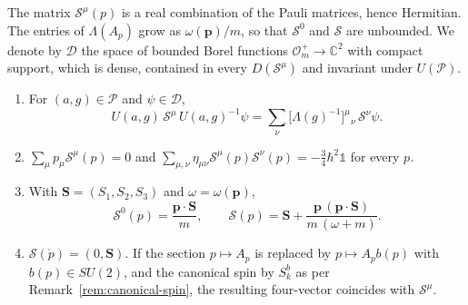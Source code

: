 \begin{remark}\label{rem:spin-four-vector-domain}
	The matrix $\mathcal{S}^\mu(p)$ is a real combination of the Pauli matrices, hence Hermitian. The entries of $\Lambda(A_p)$ grow as $\omega(\mathbf{p})/m$, so that $\mathcal{S}^0$ and $\boldsymbol{\mathcal{S}}$ are unbounded. We denote by $\mathcal{D}$ the space of bounded Borel functions $\mathcal{O}_m^+\to\mathbb{C}^2$ with compact support, which is dense, contained in every $D(\mathcal{S}^\mu)$ and invariant under $U(\mathcal{P})$.
\end{remark}

\begin{proposition}\label{prop:spin-four-vector}
	\begin{enumerate}
		\item For $(a,g)\in\mathcal{P}$ and $\psi\in\mathcal{D}$,
		\begin{equation*}
			U(a,g)\,\mathcal{S}^\mu\,U(a,g)^{-1}\psi=\sum_\nu\big[\Lambda(g)^{-1}\big]^\mu{}_\nu\,\mathcal{S}^\nu\psi.
		\end{equation*}
		\item $\sum_\mu p_\mu\mathcal{S}^\mu(p)=0$ and $\sum_{\mu,\nu}\eta_{\mu\nu}\mathcal{S}^\mu(p)\mathcal{S}^\nu(p)=-\frac34\hbar^2\mathbb{1}$ for every $p$.
		\item With $\mathbf{S}=(S_1,S_2,S_3)$ and $\omega=\omega(\mathbf{p})$,
		\begin{equation}\label{eq:spin-s0}
			\mathcal{S}^0(p)=\frac{\mathbf{p}\cdot\mathbf{S}}{m},\qquad \boldsymbol{\mathcal{S}}(p)=\mathbf{S}+\frac{\mathbf{p}\,(\mathbf{p}\cdot\mathbf{S})}{m\,(\omega+m)}.
		\end{equation}
		\item $\mathcal{S}(\mathring{p})=(0,\mathbf{S})$. If the section $p\mapsto A_p$ is replaced by $p\mapsto A_pb(p)$ with $b(p)\in SU(2)$, and the canonical spin by $S^b_k$ as per Remark~\ref{rem:canonical-spin}, the resulting four-vector coincides with $\mathcal{S}^\mu$.
	\end{enumerate}
\end{proposition}

